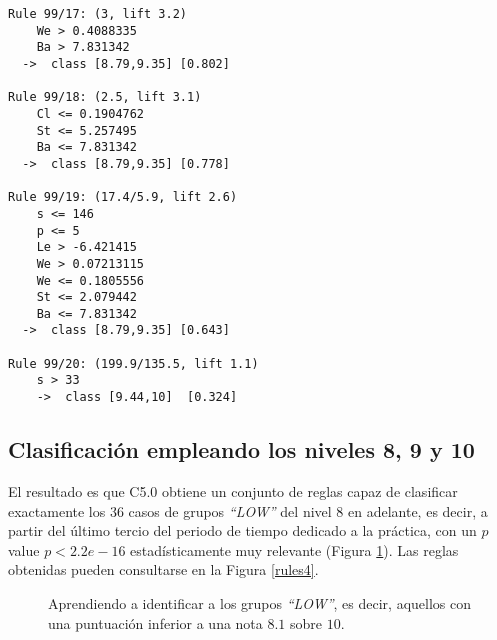 \begin{tcolorbox}[title=Reglas de clasificación para identificar intervalos de notas.]
\begin{multicols}{3}
\begin{verbatim}
Rule 99/17: (3, lift 3.2)
	We > 0.4088335
	Ba > 7.831342
  ->  class [8.79,9.35] [0.802]

Rule 99/18: (2.5, lift 3.1)
	Cl <= 0.1904762
	St <= 5.257495
	Ba <= 7.831342
  ->  class [8.79,9.35] [0.778]

Rule 99/19: (17.4/5.9, lift 2.6)
	s <= 146
	p <= 5
	Le > -6.421415
	We > 0.07213115
	We <= 0.1805556
	St <= 2.079442
	Ba <= 7.831342
  ->  class [8.79,9.35] [0.643]

Rule 99/20: (199.9/135.5, lift 1.1)
	s > 33
	->  class [9.44,10]  [0.324]
    \end{verbatim}
  \end{multicols}
\label{rules7}
\end{tcolorbox}

\subsection{Clasificación empleando los niveles 8, 9 y 10}

El resultado es que C5.0 obtiene un conjunto de reglas capaz de clasificar exactamente los $36$ casos de grupos \emph{``LOW''} del nivel $8$ en adelante, es decir, a partir del último tercio del periodo de tiempo dedicado a la práctica, con un $p$ value $p < 2.2e-16$ estadísticamente muy relevante (Figura \ref{fig:cm4}). Las reglas obtenidas pueden consultarse en la Figura \ref{rules4}.

\begin{figure}[H]
\centering
{}
\caption{Aprendiendo a identificar a los grupos \emph{``LOW''}, es decir, aquellos con una puntuación inferior a una nota $8.1$ sobre $10$.}
\label{fig:cm4}
\end{figure}

